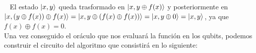 \documentclass[a4paper]{article}
\numberwithin{equation}{section}
\begin{document}
\begin{figure}[h]
\centering
{}
\end{figure}\ \linebreak
El estado $\ket{x, y}$ queda trasformado en $\ket{x, y\oplus f(x)}$ y posteriormente en \\
$\ket{x, (y\oplus f(x))\oplus f(x)} = \ket{x, y\oplus (f(x)\oplus f(x))} = \ket{x, y\oplus 0} = \ket{x, y}$, ya que $f(x)\oplus f(x) = 0$.\\
Una vez conseguido el oráculo que nos evaluará la función en los qubits, podemos construir el circuito del algoritmo que consistirá en lo siguiente:
\end{document}
